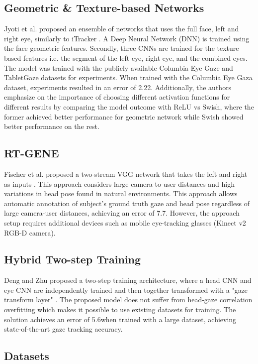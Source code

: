 \documentclass[letterpaper, 10 pt, conference]{ieeeconf}
\begin{document}
\subsection*{Geometric \& Texture-based Networks}
Jyoti et al. proposed an ensemble of networks that uses the full face, left and right eye, similarly to iTracker \cite{deng_monocular_2017}.
A Deep Neural Network (DNN) is trained using the face geometric features. Secondly, three CNNs are trained for the texture based features i.e. the segment of the left eye, right eye, and the combined eyes. The model was trained with the publicly available Columbia Eye Gaze and TabletGaze datasets for experiments. When trained with the Columbia Eye Gaza dataset, experiments resulted in an error of 2.22\degree. Additionally, the authors emphasize on the importance of choosing
different activation functions for different results by comparing the model outcome with ReLU vs Swish, where the former achieved better performance for geometric network while Swish showed better performance on the rest.

\subsection*{RT-GENE}
Fischer et al. proposed a two-stream VGG network that takes the left and right as inputs \cite{fischer_rt-gene_2018}. This approach considers large camera-to-user distances and high variations in head pose found in natural environments. This approach allows automatic annotation of subject's ground truth gaze and head pose regardless of large camera-user distances, achieving an error of 7.7\degree. However, the approach setup requires additional devices such as mobile eye-tracking glasses (Kinect v2 RGB-D camera).

\subsection*{Hybrid Two-step Training}
Deng and Zhu proposed a two-step training architecture, where a head CNN and eye CNN are independently trained and then together transformed with a "gaze transform layer" \cite{deng_monocular_2017}. The proposed model does not suffer from head-gaze correlation overfitting which makes it possible to use existing datasets for training. The solution achieves an error of 5.6\degree when trained with a large dataset, achieving state-of-the-art gaze tracking accuracy. 

\subsection{Datasets}
\label{state-art-datasets}
\end{document}
